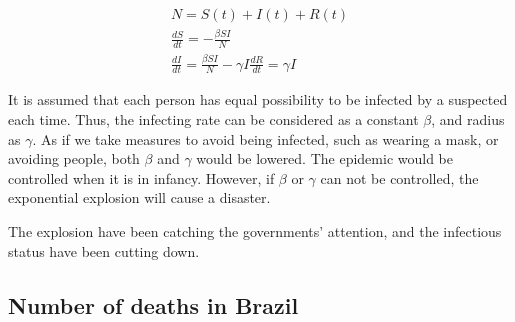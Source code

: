 \documentclass[]{article}
\begin{document}
\begin{center}
\begin{gather}
N = S(t) + I(t) + R(t)\\
\frac{dS}{dt} = -\frac{\beta SI}{N}\\
\frac{dI}{dt} = \frac{\beta SI}{N} - \gamma I
\frac{dR}{dt} = \gamma I
\end{gather}
\end{center}
\par
It is assumed that each person has equal possibility to be infected by a suspected each time. Thus, the infecting rate can be considered as a constant $\beta$, and radius as $\gamma$. As if we take measures to avoid being infected, such as wearing a mask, or avoiding people, both $\beta$ and $\gamma$ would be lowered. The epidemic would be controlled when it is in infancy. However, if $\beta$ or $\gamma$ can not be controlled, the exponential explosion will cause a disaster.
\par
The explosion have been catching the governments' attention, and the infectious status have been cutting down.

\subsection{Number of deaths in Brazil}
\end{document}
